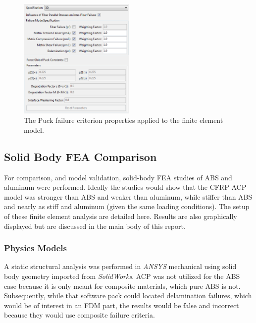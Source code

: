 \begin{figure}[htp]
\centering
\includegraphics[width=0.5\textwidth]{./figures/fea/fea-acp-puck-failure-criterion}
\caption{The Puck failure criterion properties applied to the finite element model.}
\label{fig:fea-acp-puck-failure-criterion}
\end{figure}

\clearpage

\subsection{Solid Body FEA Comparison}

\indent

For comparison, and model validation, solid-body FEA studies of ABS and aluminum were performed. Ideally the studies would show that the CFRP ACP model was stronger than ABS and weaker than aluminum, while stiffer than ABS and nearly as stiff and aluminum (given the same loading conditions). The setup of these finite element analysis are detailed here. Results are also graphically displayed but are discussed in the main body of this report.

\subsubsection{Physics Models}

\indent

A static structural analysis was performed in \emph{ANSYS} mechanical using solid body geometry imported from \emph{SolidWorks}. ACP was not utilized for the ABS case because it is only meant for composite materials, which pure ABS is not. Subsequently, while that software pack could located delamination failures, which would be of interest in an FDM part, the results would be false and incorrect because they would use composite failure criteria. \\


